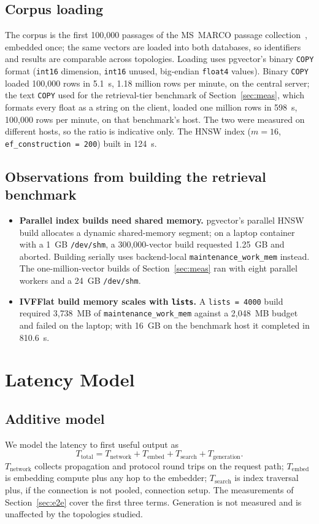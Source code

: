 \documentclass[conference]{IEEEtran}
\newcommand{\code}[1]{\texttt{#1}}
\begin{document}
\subsection{Corpus loading}
The corpus is the first 100{,}000 passages of the MS~MARCO passage collection~\cite{msmarco},
embedded once; the same vectors are loaded into both databases, so identifiers and results are
comparable across topologies. Loading uses pgvector's binary \code{COPY} format (\code{int16}
dimension, \code{int16} unused, big-endian \code{float4} values). Binary \code{COPY} loaded
100{,}000 rows in 5.1~s, 1.18 million rows per minute, on the central server; the text \code{COPY}
used for the retrieval-tier benchmark of Section~\ref{sec:meas}, which formats every float as a
string on the client, loaded one million rows in 598~s, 100{,}000 rows per minute, on that
benchmark's host. The two were measured on different hosts, so the ratio is indicative only. The HNSW index ($m = 16$,
\code{ef\_construction = 200}) built in 124~s.

\subsection{Observations from building the retrieval benchmark}
\begin{itemize}
\item \textbf{Parallel index builds need shared memory.} pgvector's parallel HNSW build allocates
a dynamic shared-memory segment; on a laptop container with a 1~GB \code{/dev/shm}, a
300{,}000-vector build requested 1.25~GB and aborted. Building serially uses backend-local
\code{maintenance\_work\_mem} instead. The one-million-vector builds of Section~\ref{sec:meas} ran
with eight parallel workers and a 24~GB \code{/dev/shm}.
\item \textbf{IVFFlat build memory scales with \code{lists}.} A \code{lists = 4000} build required
3{,}738~MB of \code{maintenance\_work\_mem} against a 2{,}048~MB budget and failed on the laptop;
with 16~GB on the benchmark host it completed in 810.6~s.
\end{itemize}

\section{Latency Model}\label{sec:model}

\subsection{Additive model}
We model the latency to first useful output as
\begin{equation}
T_{\mathrm{total}} = T_{\mathrm{network}} + T_{\mathrm{embed}} + T_{\mathrm{search}} + T_{\mathrm{generation}}.
\label{eq:total}
\end{equation}
$T_{\mathrm{network}}$ collects propagation and protocol round trips on the request path;
$T_{\mathrm{embed}}$ is embedding compute plus any hop to the embedder; $T_{\mathrm{search}}$ is
index traversal plus, if the connection is not pooled, connection setup. The measurements of
Section~\ref{sec:e2e} cover the first three terms. Generation is not measured and is unaffected by
the topologies studied.
\end{document}
